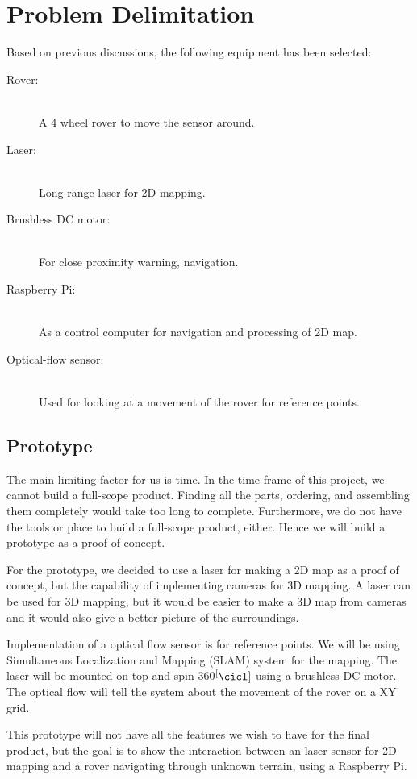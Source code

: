\section{Problem Delimitation}
Based on previous discussions, the following equipment has been selected:

\begin{description}
  \item[Rover:] \hfill \\
  A 4 wheel rover to move the sensor around.
  \item[Laser:] \hfill \\
  Long range laser for 2D mapping.
  \item[Brushless DC motor:} \hfill \\
  Used to spin the laser a full circle.
  \item[Ultra-sonic sensor:] \hfill \\
  For close proximity warning, navigation.
  \item[Raspberry Pi:] \hfill \\
  As a control computer for navigation and processing of 2D map.
  \item[Optical-flow sensor:] \hfill \\
  Used for looking at a movement of the rover for reference points.
\end{description}

\subsection{Prototype}
The main limiting-factor for us is time. In the time-frame of this project, we cannot build a full-scope product. Finding all the parts, ordering, and assembling them completely would take too long to complete. Furthermore, we do not have the tools or place to build a full-scope product, either. Hence we will build a prototype as a proof of concept.

For the prototype, we decided to use a laser for making a 2D map as a proof of concept, but the capability of implementing cameras for 3D mapping. A laser can be used for 3D mapping, but it would be easier to make a 3D map from cameras and it would also give a better picture of the surroundings.

Implementation of a optical flow sensor is for reference points. We will be using Simultaneous Localization and Mapping (SLAM) system for the mapping. The laser will be mounted on top and spin 360$^[\cicl]$ using a brushless DC motor. The optical flow will tell the system about the movement of the rover on a XY grid. 

This prototype will not have all the features we wish to have for the final product, but the goal is to show the interaction between an laser sensor for 2D mapping and a rover navigating through unknown terrain, using a Raspberry Pi.

